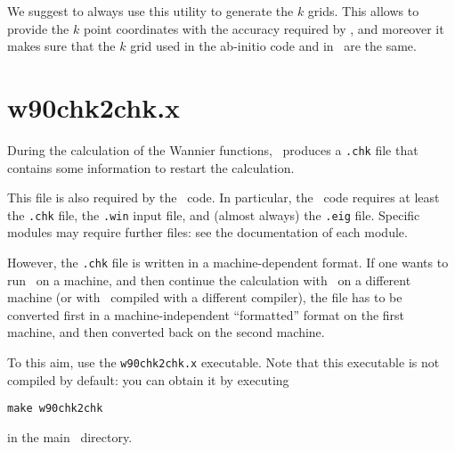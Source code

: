 We suggest to always use this utility to generate the $k$ grids. This
allows to
provide the $k$ point coordinates with the accuracy required by
\wannier, and moreover it
makes sure that the $k$ grid used in the ab-initio code and in
\wannier\ are the same.

\section{w90chk2chk.x}
During the calculation of the Wannier functions, \wannier\ produces a
\verb|.chk| file that contains some information to restart the
calculation.

This file is also required by the \postw\ code. 
In particular, the \postw\ code requires at least the \verb|.chk| file, the
\verb|.win| input file, and (almost always) the \verb|.eig|
file. Specific modules may require further files: see the
documentation of each module.

However, the \verb|.chk| file is
written in a machine-dependent format. If one wants to run \wannier\
on a machine, and then continue the calculation with \postw\ on a
different machine (or with \postw\ compiled with a different compiler), the file has to be
converted first in a machine-independent ``formatted'' format on the
first machine, and
then converted back on the second machine.

To this aim, use the \verb|w90chk2chk.x| executable. Note that this
executable is not compiled by default: you can obtain it by executing 
\begin{verbatim}
make w90chk2chk
\end{verbatim}
in the main \wannier\ directory.

